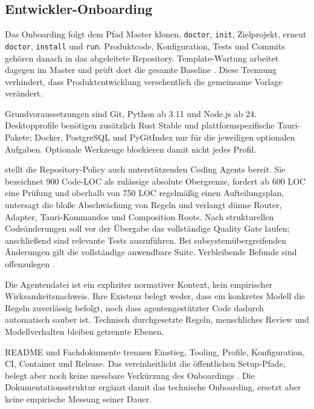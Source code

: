 \subsection{Entwickler-Onboarding}
\label{subsec:entwickler-onboarding}

Das Onboarding folgt dem Pfad Master klonen, \texttt{doctor}, \texttt{init},
Zielprojekt, erneut \texttt{doctor}, \texttt{install} und \texttt{run}.
Produktcode, Konfiguration, Tests und Commits gehören danach in das abgeleitete
Repository. Template-Wartung arbeitet dagegen im Master und prüft dort die
gesamte Baseline
\parencite{kleiveist2026governance-snapshot,kleiveist2026profiles}.
Diese Trennung verhindert, dass Produktentwicklung versehentlich die gemeinsame
Vorlage verändert.

Grundvoraussetzungen sind Git, Python ab 3.11 und Node.js ab 24. Desktopprofile
benötigen zusätzlich Rust Stable und plattformspezifische Tauri-Pakete;
Docker, PostgreSQL und PyGitIndex nur für die jeweiligen optionalen Aufgaben.
Optionale Werkzeuge blockieren damit nicht jedes Profil.

 stellt die Repository-Policy auch unterstützenden Coding
Agents bereit. Sie bezeichnet 900 Code-LOC als zulässige absolute Obergrenze,
fordert ab 600 LOC eine Prüfung und oberhalb von 750 LOC regelmäßig einen
Aufteilungsplan, untersagt die bloße Abschwächung von Regeln und verlangt dünne
Router, Adapter, Tauri-Kommandos und Composition Roots. Nach strukturellen
Codeänderungen soll vor der Übergabe das vollständige Quality Gate laufen;
anschließend sind relevante Tests auszuführen. Bei subsystemübergreifenden
Änderungen gilt die vollständige anwendbare Suite. Verbleibende Befunde sind
offenzulegen
\parencite{kleiveist2026agents}.

Die Agentendatei ist ein expliziter normativer Kontext, kein empirischer
Wirksamkeitsnachweis. Ihre Existenz belegt weder, dass ein konkretes Modell die
Regeln zuverlässig befolgt, noch dass agentengestützter Code dadurch
automatisch sauber ist. Technisch durchgesetzte Regeln, menschliches Review und
Modellverhalten bleiben getrennte Ebenen.

README und Fachdokumente trennen Einstieg, Tooling, Profile, Konfiguration, CI,
Container und Release. Das vereinheitlicht die öffentlichen Setup-Pfade,
belegt aber noch keine messbare Verkürzung des Onboardings
\parencite{kleiveist2026tooling,kleiveist2026configuration,kleiveist2026ci,kleiveist2026release}.
Die Dokumentationsstruktur ergänzt damit das technische Onboarding, ersetzt
aber keine empirische Messung seiner Dauer.

